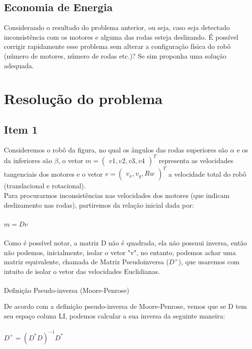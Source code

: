 \documentclass{article}
\begin{document}
\subsection{Economia de Energia}

Considerando o resultado do problema anterior, ou seja, caso seja detectado inconsistência com os motores e alguma das rodas esteja deslizando.
É possível corrigir rapidamente esse problema sem alterar a configuração física do robô (número de motores, número de rodas etc.)? Se sim proponha uma solução adequada.

\section{Resolução do problema}
\subsection{Item 1}

Consideremos o robô da figura, no qual os ângulos das rodas superiores são $\alpha$ e os da inferiores são $\beta$, o vetor $m = \begin{pmatrix} v1,v2,v3,v4 \end{pmatrix}^T$ representa
as velocidades tangenciais dos motores e o vetor $v = \begin{pmatrix} v_{x},v_{y},Rw \end{pmatrix}^T$ a velocidade total do robô (translacional e rotacional).
\\ Para procurarmos inconsistências nas velocidades dos motores (que indicam deslizamento nas rodas), partiremos da relação inicial dada por:
\\ \\ $m = Dv$ \\ \\
Como é possível notar, a matriz D não é quadrada, ela não possuui inversa, então não podemos, inicialmente, isolar o vetor "v", no entanto, podemos achar uma matriz equivalente, chamada de Matriz Pseudoinversa ($D^+$), que usaremos com intuito de isolar o vetor das velocidades Euclidianas.
\\ \\ Definição Pseudo-inversa (Moore-Penrose)

De acordo com a definição pseudo-inversa de Moore-Penrose, vemos que se D tem seu espaço coluna LI, podemos calcular a sua inversa da seguinte maneira:
\\ \\ $D^+ = (D^*D)^{-1} D^*$
\end{document}
